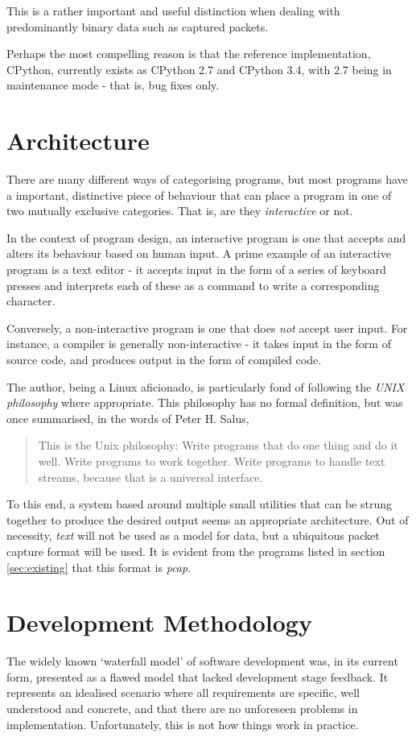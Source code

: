 \documentclass[10pt,a4paper,notitlepage]{report}
\begin{document}
This is a rather important and useful distinction when dealing with predominantly binary data such as captured packets.

Perhaps the most compelling reason is that the reference implementation, CPython, currently exists as CPython 2.7 and CPython 3.4, with 2.7 being in maintenance mode\cite{cpy2maint} - that is, bug fixes only.

\section{Architecture}
There are many different ways of categorising programs, but most programs have a important, distinctive piece of behaviour that can place a program in one of two mutually exclusive categories. That is, are they \emph{interactive} or not.

In the context of program design, an interactive program is one that accepts and alters its behaviour based on human input.
A prime example of an interactive program is a text editor - it accepts input in the form of a series of keyboard presses and interprets each of these as a command to write a corresponding character.

Conversely, a non-interactive program is one that does \emph{not} accept user input. For instance, a compiler is generally non-interactive - it takes input in the form of source code, and produces output in the form of compiled code.

The author, being a Linux aficionado, is particularly fond of following the \emph{UNIX philosophy} where appropriate. This philosophy has no formal definition, but was once summarised, in the words of Peter H. Salus\cite{qcou},
\begin{quote}
This is the Unix philosophy: Write programs that do one thing and do it well. Write programs to work together. Write programs to handle text streams, because that is a universal interface.
\end{quote}

To this end, a system based around multiple small utilities that can be strung together to produce the desired output seems an appropriate architecture. Out of necessity, \emph{text} will not be used as a model for data, but a ubiquitous packet capture format will be used. It is evident from the programs listed in section \ref{sec:existing} that this format is \emph{pcap}.

\section{Development Methodology}
The widely known `waterfall model' of software development was, in its current form, presented as a flawed model that lacked development stage feedback\cite{wwr-waterfall-notes}. It represents an idealised scenario where all requirements are specific, well understood and concrete, and that there are no unforeseen problems in implementation. Unfortunately, this is not how things work in practice.
\end{document}
